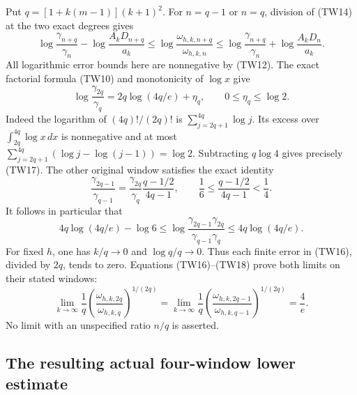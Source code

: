 \documentclass[11pt,a4paper]{article}
\begin{document}
Put $q=[1+k(m-1)](k+1)^2$.  For $n=q-1$ or $n=q$, division of
(TW14) at the two exact degrees gives
\[
 \log\frac{\gamma_{n+q}}{\gamma_n}
       -\log\frac{A_kD_{n+q}}{a_k}
 \leq\log\frac{\omega_{h,k,n+q}}{\omega_{h,k,n}}
 \leq\log\frac{\gamma_{n+q}}{\gamma_n}
       +\log\frac{A_kD_n}{a_k}.
 \tag{TW16}
\]
All logarithmic error bounds here are nonnegative by (TW12).
The exact factorial formula (TW10) and monotonicity of $\log x$ give
\[
 \log\frac{\gamma_{2q}}{\gamma_q}
 =2q\log(4q/e)+\eta_q,\qquad 0\leq\eta_q\leq\log2.
 \tag{TW17}
\]
Indeed the logarithm of $(4q)!/(2q)!$ is
$\sum_{j=2q+1}^{4q}\log j$.  Its excess over
$\int_{2q}^{4q}\log x\,dx$ is nonnegative and at most
$\sum_{j=2q+1}^{4q}(\log j-\log(j-1))=\log2$.
Subtracting $q\log4$ gives precisely (TW17).
The other original window satisfies the exact identity
\[
 \frac{\gamma_{2q-1}}{\gamma_{q-1}}
 =\frac{\gamma_{2q}}{\gamma_q}\frac{q-1/2}{4q-1},
 \qquad \frac16\leq\frac{q-1/2}{4q-1}<\frac14.
\]
It follows in particular that
\[
 4q\log(4q/e)-\log6
 \leq\log\frac{\gamma_{2q-1}\gamma_{2q}}
                    {\gamma_{q-1}\gamma_q}
 \leq4q\log(4q/e).
 \tag{TW18}
\]
For fixed $h$, one has $k/q\to0$ and $\log q/q\to0$.
Thus each finite error in (TW16), divided by $2q$, tends to zero.
Equations (TW16)--(TW18) prove both limits on their stated windows:
\[
 \boxed{
 \lim_{k\to\infty}\frac1q
 \left(\frac{\omega_{h,k,2q}}{\omega_{h,k,q}}\right)^{1/(2q)}
 =\lim_{k\to\infty}\frac1q
 \left(\frac{\omega_{h,k,2q-1}}{\omega_{h,k,q-1}}\right)^{1/(2q)}
 =\frac4e.}\tag{TW19}
\]
No limit with an unspecified ratio $n/q$ is asserted.

\subsection{The resulting actual four-window lower estimate}
\end{document}
